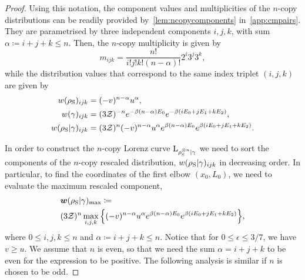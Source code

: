 \documentclass[pra,
aps,
twocolumn,
superscriptaddress,
groupedaddress,
nofootinbib,
reprint
]{revtex4-1}
\begin{document}
\begin{proof}
Using this notation, the component values and multiplicities of the $n$-copy distributions can be readily provided by~\cref{lem:ncopycomponents} in~\cref{app:cmpairs}.
They are parametrised by three independent components $i,j,k$, with sum $\alpha \coloneqq i+j+k \leq n$.
Then, the $n$-copy multiplicity is given by
\begin{equation}
	m_{ijk} = \frac{n!}{i!j!k!(n-\alpha)!} 2^i 3^j 3^k,
\end{equation}
while the distribution values that correspond to the same index triplet $(i,j,k)$ are given by
\begin{align}
	w(\rho_{\rm{S}})_{ijk} &= (-v)^{n-\alpha} u^{\alpha}, \\
	w(\gamma)_{ijk} &= (3\mathcal{Z})^{-n} e^{-\beta (n-\alpha)E_0} e^{-\beta ( i E_0 + j E_1 + k E_2 )}, \\
	w(\rho_{\rm{S}} | \gamma)_{ijk} &= (3\mathcal{Z})^{n} (-v)^{n-\alpha} u^{\alpha} e^{\beta (n-\alpha)E_0} e^{\beta ( i E_0 + j E_1 + k E_2 )}.
\end{align}

In order to construct the $n$-copy Lorenz curve ${{\rm{L}}_{\rho_{\rm{S}}^{\otimes n}|\gamma}}$ we need to sort the components of the $n$-copy rescaled distribution, $w(\rho_{\rm{S}} | \gamma)_{ijk}$ in decreasing order.
In particular, to find the coordinates of the first elbow $(x_0, L_0)$, we need to evaluate the maximum rescaled component,
\begin{align}
	&\bm{w}(\rho_{\rm{S}} | \gamma)_{\rm{max}} \coloneqq \label{eq:max_slope}\\
	&(3\mathcal{Z})^{n} \max\limits_{i,j,k}\Big\{ (-v)^{n-\alpha} u^{\alpha} e^{\beta (n-\alpha)E_0} e^{\beta ( i E_0 + j E_1 + k E_2 )} \Big\}, \nonumber
\end{align}
where $0 \leq i,j,k \leq n$ and $\alpha \coloneqq i+j+k \leq n$.
Notice that for $0 \leq \epsilon \leq 3/7$, we have $v \geq u$. 
We assume that $n$ is even, so that we need the sum $\alpha = i+j+k$ to be even for the expression to be positive. 
The following analysis is similar if $n$ is chosen to be odd.


\end{proof}
\end{document}
